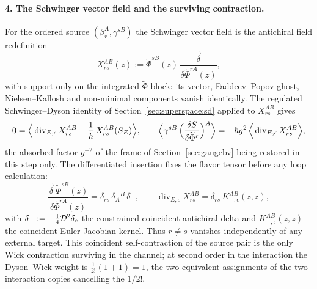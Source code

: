 \paragraph{4. The Schwinger vector field and the surviving contraction.}
For the ordered source $(\beta_{r}^{A},\gamma^{sB})$ the Schwinger vector
field is the antichiral field redefinition
\begin{equation}\label{eq:ss:bc:X}
X_{rs}^{AB}(z)
:=\widetilde\Phi^{sB}(z)\,
\frac{\vec\delta}{\delta\widetilde\Phi^{rA}(z)} ,
\end{equation}
with support only on the integrated $\widetilde\Phi$ block: its vector,
Faddeev--Popov ghost, Nielsen--Kallosh and non-minimal components vanish
identically. The regulated Schwinger--Dyson identity of
Section~\ref{sec:superspace:sd} applied to $X_{rs}^{AB}$ gives
\begin{equation}\label{eq:ss:bc:sd}
0=\Big\langle
\operatorname{div}_{E,\epsilon}X_{rs}^{AB}
-\frac{1}{\hbar}\,X_{rs}^{AB}(S_{E})\Big\rangle,
\qquad
\Big\langle\gamma^{sB}\,
\Big(\frac{\delta S}{\delta\widetilde\Phi^{r}}\Big)^{A}\Big\rangle
=-\hbar g^{2}\,
\Big\langle\operatorname{div}_{E,\epsilon}X_{rs}^{AB}\Big\rangle ,
\end{equation}
the absorbed factor $g^{-2}$ of the frame of Section~\ref{sec:gaugebv} being
restored in this step only. The differentiated insertion fixes the flavor
tensor before any loop calculation:
\begin{equation}\label{eq:ss:bc:div}
\frac{\vec\delta\,\widetilde\Phi^{sB}(z)}{\delta\widetilde\Phi^{rA}(z)}
=\delta_{rs}\,\delta_{A}{}^{B}\,\delta_{-},
\qquad
\operatorname{div}_{E,\epsilon}X_{rs}^{AB}
=\delta_{rs}\,K_{-,\epsilon}^{AB}(z,z) ,
\end{equation}
with $\delta_{-}:=-\tfrac14\mathcal{D}^{2}\delta_{e}$ the constrained coincident
antichiral delta and $K_{-,\epsilon}^{AB}(z,z)$ the coincident Euler-Jacobian
kernel. Thus $r\neq s$ vanishes independently of any external target. This
coincident self-contraction of the source pair is the only Wick contraction
surviving in the channel; at second order in the interaction the Dyson--Wick
weight is $\tfrac{1}{2!}(1+1)=1$, the two equivalent assignments of the two
interaction copies cancelling the $1/2!$.

